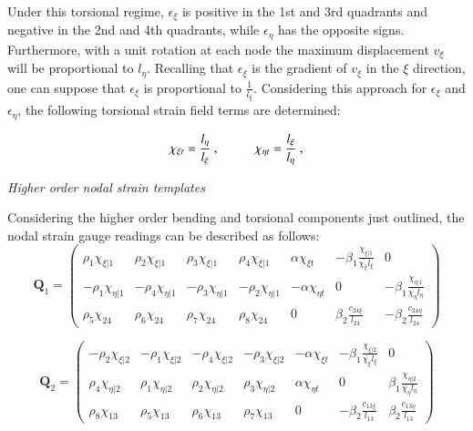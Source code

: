 Under this torsional regime, $\epsilon_\xi$ is positive in the 1st and 3rd quadrants and negative in the 2nd and 4th quadrants, while $\epsilon_\eta$ has the opposite signs. Furthermore, with a unit rotation at each node the maximum displacement $v_\xi$ will be proportional to $l_\eta$. Recalling that $\epsilon_{\xi}$ is the gradient of $v_\xi$ in the $\xi$ direction, one can suppose that $\epsilon_{\xi}$ is proportional to $\frac{1}{l_\xi}$. Considering this approach for $\epsilon_{\xi}$ and $\epsilon_{\eta}$, the following torsional strain field terms are determined:

\begin{equation} 
\chi_{\xi t} = \frac{l_\eta}{l_\xi}\ ,
\hspace{10mm}
\chi_{\eta t} = \frac{l_\xi}{l_\eta}\ ,
\label{equation13}
\end{equation}

\textit{Higher order nodal strain templates}

Considering the higher order bending and torsional components just outlined, the nodal strain gauge readings can be described as follows:
\begin{equation} 
\mathbf{Q}_1 =
\begin{pmatrix}
\rho_1 \chi_{\xi | 1} & \rho_2 \chi_{\xi | 1} & \rho_3 \chi_{\xi | 1} & \rho_4 \chi_{\xi | 1} & \alpha \chi_{\xi t} & -\beta_1 \frac{\chi_{\xi | 1}}{\bar{\chi_\xi} l_\xi} & 0  \\	
-\rho_1 \chi_{\eta | 1} & -\rho_4 \chi_{\eta | 1} & -\rho_3 \chi_{\eta | 1} & -\rho_2 \chi_{\eta | 1} & -\alpha \chi_{\eta t} & 0 & -\beta_1 \frac{\chi_{\eta | 1}}{\bar{\chi_\eta} l_\eta} \\
\rho_5 \chi_{24} & \rho_6 \chi_{24} & \rho_7 \chi_{24} & \rho_8 \chi_{24} & 0 & \beta_2 \frac{c_{24 \xi}}{l_{24}} & -\beta_2 \frac{c_{24 \eta}}{l_{24}}
\end{pmatrix}		
\label{equation14}
\end{equation}

\begin{equation} 
\mathbf{Q}_2 =
\begin{pmatrix}
-\rho_2 \chi_{\xi | 2} & -\rho_1 \chi_{\xi | 2} & -\rho_4 \chi_{\xi | 2} & -\rho_3 \chi_{\xi | 2} & -\alpha \chi_{\xi t} & -\beta_1 \frac{\chi_{\xi | 2}}{\bar{\chi_\xi} l_\xi} & 0  \\	
\rho_4 \chi_{\eta | 2} & \rho_1 \chi_{\eta | 2} & \rho_2 \chi_{\eta | 2} & \rho_3 \chi_{\eta | 2} & \alpha \chi_{\eta t} & 0 & \beta_1 \frac{\chi_{\eta | 2}}{\bar{\chi_\eta} l_\eta} \\
\rho_8 \chi_{13} & \rho_5 \chi_{13} & \rho_6 \chi_{13} & \rho_7 \chi_{13} & 0 & -\beta_2 \frac{c_{13 \xi}}{l_{13}} & \beta_2 \frac{c_{13 \eta}}{l_{13}}
\end{pmatrix}		
\label{equation14_2}
\end{equation}

